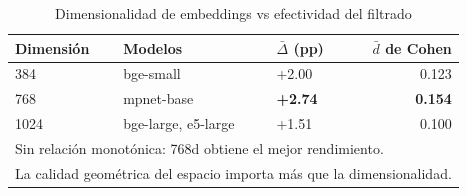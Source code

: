 \begin{table}[htbp]
\centering
\caption{Dimensionalidad de embeddings vs efectividad del filtrado}
\label{tab:embedding_dimension}
\begin{tabular}{lllr}
\toprule
\textbf{Dimensión} & \textbf{Modelos} & \textbf{$\bar{\Delta}$ (pp)} & \textbf{$\bar{d}$ de Cohen} \\
\midrule
384  & bge-small           & +2.00 & 0.123 \\
768  & mpnet-base          & \textbf{+2.74} & \textbf{0.154} \\
1024 & bge-large, e5-large & +1.51 & 0.100 \\
\midrule
\multicolumn{4}{l}{\small Sin relación monotónica: 768d obtiene el mejor rendimiento.} \\
\multicolumn{4}{l}{\small La calidad geométrica del espacio importa más que la dimensionalidad.} \\
\bottomrule
\end{tabular}
\end{table}
